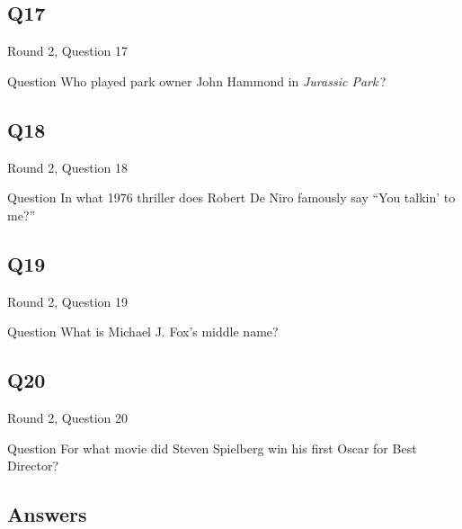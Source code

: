 \documentclass[11pt]{beamer}
\begin{document}
\subsection*{Q17}
\begin{frame}[t]{Round 2, Question 17}
\vspace{2em}
\begin{block}{Question}
Who played park owner John Hammond in \emph{Jurassic Park}\,?
\end{block}
\end{frame}
    

\subsection*{Q18}
\begin{frame}[t]{Round 2, Question 18}
\vspace{2em}
\begin{block}{Question}
In what 1976 thriller does Robert De Niro famously say ``You talkin' to me?''
\end{block}
\end{frame}
    

\subsection*{Q19}
\begin{frame}[t]{Round 2, Question 19}
\vspace{2em}
\begin{block}{Question}
What is Michael J. Fox's middle name?
\end{block}
\end{frame}
    

\subsection*{Q20}
\begin{frame}[t]{Round 2, Question 20}
\vspace{2em}
\begin{block}{Question}
For what movie did Steven Spielberg win his first Oscar for Best Director?
\end{block}
\end{frame}
    
\subsection{Answers}
\end{document}
